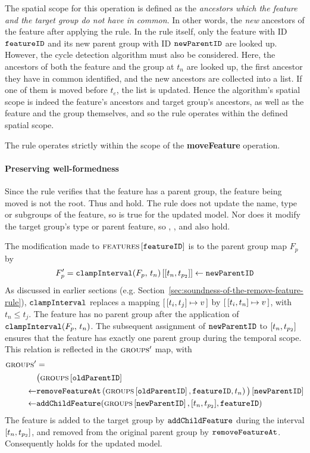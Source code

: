   The spatial scope for this operation is defined as the \emph{ancestors which the feature and the target group do not have in common}. In other words, the \emph{new} ancestors of the feature after applying the rule. In the rule itself, only the feature with ID $\texttt{featureID}$ and its new parent group with ID $\texttt{newParentID}$ are looked up. However, the cycle detection algorithm must also be considered. Here, the ancestors of both the feature and the group at $t_n$ are looked up, the first ancestor they have in common identified, and the new ancestors are collected into a list. If one of them is moved before $t_e$, the list is updated. Hence the algorithm's spatial scope is indeed the feature's ancestors and target group's ancestors, as well as the feature and the group themselves, and so the rule operates within the defined spatial scope.
\\

\begin{lemma}
   The  rule operates strictly within the scope of the \textbf{moveFeature} operation.
   \label{lemma:move-feature-scope}
\end{lemma}

\paragraph{Preserving well-formedness}
Since the rule verifies that the feature has a parent group, the feature being moved is not the root. Thus  and  hold. The rule does not update the name, type or subgroups of the feature, so  is true for the updated model. Nor does it modify the target group's type or parent feature, so , , and  also hold.

The modification made to $\textsc{features} \left[ \texttt{featureID} \right]$ is to the parent group map $F_p$ by 
\[
   F_p' = \lookup{\var{clampInterval}(F_p, \, t_n)}{\interval{t_n}{t_{p_2}}} \assign \var{newParentID}
\]
As discussed in earlier sections (e.g. Section~\vref{sec:soundness-of-the-remove-feature-rule}), $\texttt{clampInterval}$ replaces a mapping $\intervalmapping{t_i}{t_j}{v}$ by $\intervalmapping{t_i}{t_n}{v}$, with $t_n \leq t_j$. The feature has no parent group  after the application of $\texttt{clampInterval}(F_p, \, t_n)$. The subsequent assignment of $\texttt{newParentID}$ to $\interval{t_n}{t_{p_2}}$ ensures that the feature has exactly one parent group during the temporal scope. This relation is reflected in the $\textsc{groups}{}{}'$ map, with
\begin{align*}
   \groups' &= \\
   \lookup{&\big(\lookup{\groups{}}{\var{oldParentID}} \\
   \assign & \var{removeFeatureAt}\left(\lookup{\groups{}}{\var{oldParentID}}, \var{featureID}, t_n\right)\big)}{\var{newParentID}} \\
   \assign& \var{addChildFeature}(\lookup{\groups{}}{\var{newParentID}}, \interval{t_n}{t_{p_2}}, \var{featureID})
\end{align*}
The feature is added to the target group by $\texttt{addChildFeature}$ during the interval $\interval{t_n}{t_{p_2}}$, and removed from the original parent group by $\texttt{removeFeatureAt}$. Consequently  holds for the updated model. 

